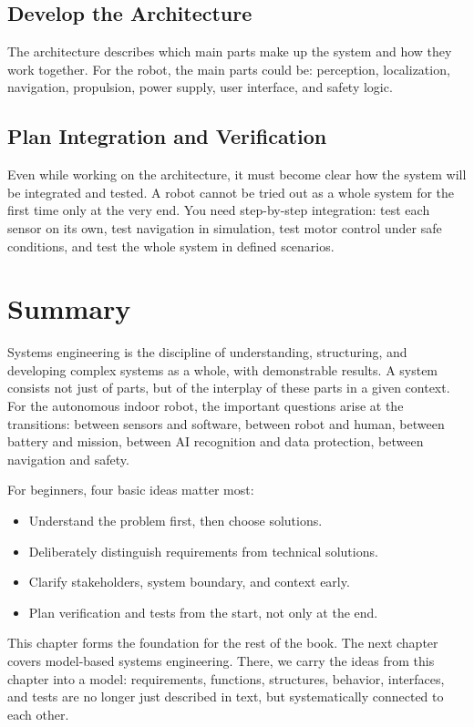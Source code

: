 \subsection{Develop the Architecture}
The architecture describes which main parts make up the system and how they work together. For the robot, the main parts could be: perception, localization, navigation, propulsion, power supply, user interface, and safety logic.

\subsection{Plan Integration and Verification}
Even while working on the architecture, it must become clear how the system will be integrated and tested. A robot cannot be tried out as a whole system for the first time only at the very end. You need step-by-step integration: test each sensor on its own, test navigation in simulation, test motor control under safe conditions, and test the whole system in defined scenarios.

\section{Summary}
Systems engineering is the discipline of understanding, structuring, and developing complex systems as a whole, with demonstrable results. A system consists not just of parts, but of the interplay of these parts in a given context. For the autonomous indoor robot, the important questions arise at the transitions: between sensors and software, between robot and human, between battery and mission, between AI recognition and data protection, between navigation and safety.

For beginners, four basic ideas matter most:

\begin{itemize}
    \item Understand the problem first, then choose solutions.
    \item Deliberately distinguish requirements from technical solutions.
    \item Clarify stakeholders, system boundary, and context early.
    \item Plan verification and tests from the start, not only at the end.
\end{itemize}

This chapter forms the foundation for the rest of the book. The next chapter covers model-based systems engineering. There, we carry the ideas from this chapter into a model: requirements, functions, structures, behavior, interfaces, and tests are no longer just described in text, but systematically connected to each other.

